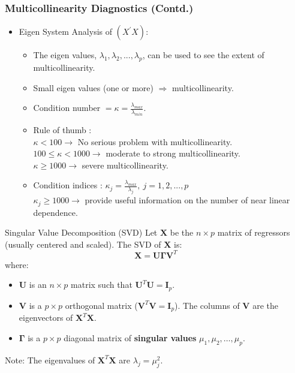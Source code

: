\documentclass[10pt]{beamer} %
\begin{document}
\begin{frame}
   \frametitle{Multicollinearity Diagnostics (Contd.)}
   \begin{itemize}
      \item Eigen System Analysis of $(X^{'}X)$:
         \begin{itemize}
            \item The eigen values, $\lambda_1,\lambda_2,...,\lambda_p$, can be
               used to see the extent of multicollinearity.
               \vspace{0.25cm}
            \item Small eigen values (one or more) $\Rightarrow$ multicollinearity.
               \vspace{0.25cm}
            \item Condition number $=\kappa=\frac{\lambda_{max}}{\lambda_{min}}$.
               \vspace{0.25cm}
            \item Rule of thumb : \\[0.15cm] $\kappa<100 \rightarrow$ No serious
               problem with multicollinearity. \\[0.15cm]
               $100 \leq \kappa <1000 \rightarrow$ moderate to strong multicollinearity. \\[0.15cm]
               $\kappa \geq 1000 \rightarrow$ severe multicollinearity.
               \vspace{0.25cm}
            \item Condition indices : $\kappa_{j}=\frac{\lambda_{max}}{\lambda_{j}},\
               j=1,2,...,p$ \\[0.15cm]
               $\kappa_{j} \geq 1000 \rightarrow$ provide useful information on the
               number of near linear dependence.
         \end{itemize}
   \end{itemize}    
\end{frame}

\begin{frame}{Singular Value Decomposition (SVD)}
    Let $\mathbf{X}$ be the $n \times p$ matrix of regressors (usually centered and scaled). The SVD of $\mathbf{X}$ is:
    $$\mathbf{X} = \mathbf{U}\mathbf{\Gamma}\mathbf{V}^T$$
    where:
    \begin{itemize}
        \item $\mathbf{U}$ is an $n \times p$ matrix such that $\mathbf{U}^T\mathbf{U} = \mathbf{I}_p$.
        \item $\mathbf{V}$ is a $p \times p$ orthogonal matrix ($\mathbf{V}^T\mathbf{V} = \mathbf{I}_p$). The columns of $\mathbf{V}$ are the eigenvectors of $\mathbf{X}^T\mathbf{X}$.
        \item $\mathbf{\Gamma}$ is a $p \times p$ diagonal matrix of
           \textbf{singular values} $\mu_1, \mu_2, \dots, \mu_p$.
    \end{itemize}
    \vspace{0.2cm}
    Note: The eigenvalues of $\mathbf{X}^T\mathbf{X}$ are $\lambda_j = \mu_j^2$.
\end{frame}
\end{document}

